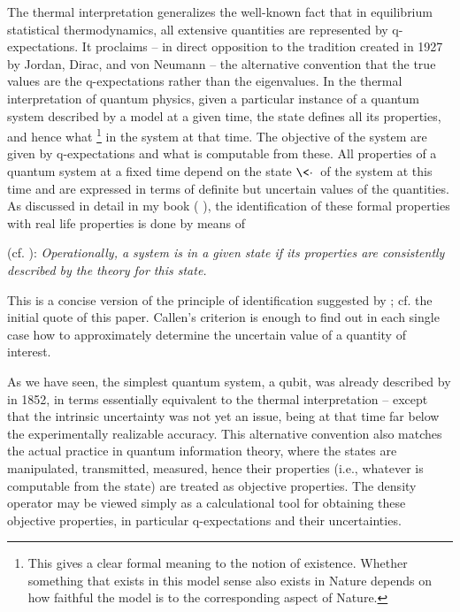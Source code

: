 \documentclass[12pt]{article}
\begin{document}
The thermal interpretation generalizes the well-known fact that in
equilibrium statistical thermodynamics, all extensive quantities are
represented by q-expectations. It proclaims
-- in direct opposition to the tradition created in 1927 by Jordan,
Dirac, and von Neumann -- the alternative convention that the true
values are the q-expectations rather than the eigenvalues. 
In the thermal interpretation of quantum physics, given a particular 
instance of a quantum system described by a model at a given time, the 
state defines all its properties, and hence what \footnote{
This gives a clear formal meaning to the notion of existence. Whether
something that exists in this model sense also exists in Nature depends
on how faithful the model is to the corresponding aspect of Nature.
} %
in the system at that time. The objective  of the system
are given by q-expectations and what is computable from these. 
All properties of a quantum system at a fixed time depend on the state 
$\<\cdot\>$ of the system at this time and are expressed in terms of 
definite but uncertain values of the quantities. As discussed in detail 
in my book ( \cite{Neu.CQP}), the identification of 
these formal properties with real life properties is done by means of

  (cf.  \cite[p.15]{Cal}):
{\it Operationally, a system is in a given state if its properties are
consistently described by the theory for this state.
} %

This is a concise version of the principle of identification suggested
by  \cite[p.222]{Edd}; cf. the initial quote of this 
paper. Callen's criterion is enough to find out in each single case how 
to approximately determine the uncertain value of a quantity of 
interest. 

As we have seen, the simplest quantum system, a qubit, was already 
described by  \cite{Sto} in 1852, in terms essentially 
equivalent to the thermal interpretation -- except that the intrinsic 
uncertainty was not yet an issue, being at that time far below the 
experimentally realizable accuracy. This alternative convention also 
matches the actual practice in quantum information theory, where the 
states are manipulated, transmitted, measured, hence their properties 
(i.e., whatever is computable from the state) are 
treated as objective properties. The density operator may be viewed 
simply as a calculational tool for obtaining these objective properties,
in particular q-expectations and their uncertainties.
\end{document}
